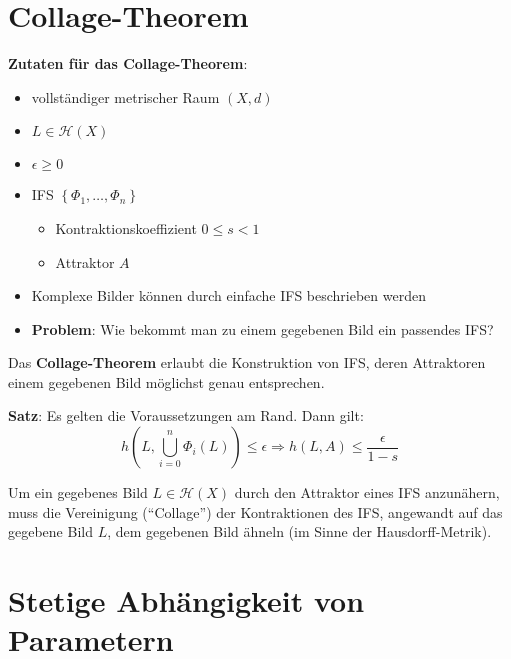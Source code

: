 \documentclass[afourpaper]{latex-classes/handout}
\newcommand{\marginrule}{\makebox[\linewidth]{\rule{\linewidth}{0.4pt}}}
\renewcommand{\emph}[1]{\textcolor{kitGreen}{#1}}
\begin{document}
\section{Collage-Theorem}

\begin{marginfigure}
  \textbf{Zutaten für das Collage-Theorem}:
  \begin{itemize}
    \item vollständiger metrischer Raum \( (X,d) \)
    \item \( L \in \mathcal{H}(X) \)
    \item \( \epsilon \geq 0 \)
    \item IFS \( \left \{ \Phi_1,\dots,\Phi_n \right \} \)
    \begin{itemize}
      \item Kontraktionskoeffizient \( 0 \leq s < 1 \) 
      \item Attraktor \( A \)
    \end{itemize}
  \end{itemize}
  \marginrule{}
\end{marginfigure}

\begin{itemize}
  \item Komplexe Bilder können durch einfache IFS beschrieben werden
  \item \textbf{Problem}: Wie bekommt man zu einem gegebenen Bild ein passendes IFS?\@
\end{itemize}

Das \textbf{Collage-Theorem} erlaubt die Konstruktion von IFS, deren Attraktoren einem gegebenen Bild möglichst genau entsprechen.

\emph{\textbf{Satz}}: Es gelten die Voraussetzungen am Rand. Dann gilt:
\begin{equation*}
  h\left( L,\bigcup_{i=0}^n \Phi_i(L) \right) \leq \epsilon \Rightarrow h(L,A) \leq \frac{\epsilon}{1 - s}
\end{equation*}

Um ein gegebenes Bild \( L \in \mathcal{H}(X) \) durch den Attraktor eines IFS anzunähern, muss die Vereinigung (``Collage'') der Kontraktionen des IFS, angewandt auf das gegebene Bild \( L \), dem gegebenen Bild ähneln (im Sinne der Hausdorff-Metrik).

\section{Stetige Abhängigkeit von Parametern}
\end{document}
